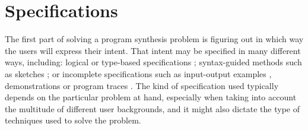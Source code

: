 \section{Specifications}
\label{sec:specifications}



The first part of solving a program synthesis problem is figuring out in which
way the users will express their intent.
That intent may be specified in many different ways, including:
  logical \cite{Itzhaky:SIS:2010}
  or type-based specifications \cite{Osera:2015:TPS, Frankle:2016:EST,
    Polikarpova:2016:PSP};
  syntax-guided methods \cite{Alur:sygus:2013} such as
  sketches \cite{Solar-Lezama:2008};
  or incomplete specifications such as
  input-output examples \cite{Frankle:2016:EST, Gulwani:2012:SDM, Leung:2015:IPS},
  demonstrations \cite{Lau2003}
  or program traces \cite{Lau:traces:2003}.
The kind of specification used typically depends on the particular problem at
hand, especially when taking into account the multitude of different user
backgrounds, and it might also dictate the type of techniques used to solve the
problem.



% 

